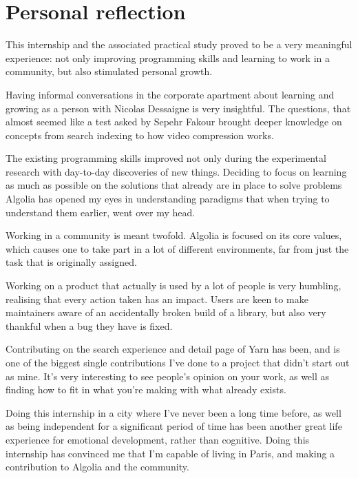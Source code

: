 \section{Personal reflection}

This internship and the associated practical study proved to be a very meaningful experience: not only improving programming skills and learning to work in a community, but also stimulated personal growth.

Having informal conversations in the corporate apartment about learning and growing as a person with Nicolas Dessaigne is very insightful. The questions, that almost seemed like a test asked by Sepehr Fakour brought deeper knowledge on concepts from search indexing to how video compression works.

The existing programming skills improved not only during the experimental research with day-to-day discoveries of new things. Deciding to focus on learning as much as possible on the solutions that already  are in place to solve problems Algolia has opened my eyes in understanding paradigms that when trying to understand them earlier, went over my head.

Working in a community is meant twofold. Algolia is focused on its core values, which causes one to take part in a lot of different environments, far from just the task that is originally assigned.

Working on a product that actually is used by a lot of people is very humbling, realising that every action taken has an impact. Users are keen to make maintainers aware of an accidentally broken build of a library, but also very thankful when a bug they have is fixed.

Contributing on the search experience and detail page of Yarn has been, and is one of the biggest single contributions I've done to a project that didn't start out as mine. It's very interesting to see people's opinion on your work, as well as finding how to fit in what you're making with  what already exists.

Doing this internship in a city where I've never been a long time before, as well as being independent for a significant period of time has been another great life experience for emotional development, rather than cognitive. Doing this internship has convinced me that I'm capable of living in Paris, and making a contribution to Algolia and the community.
